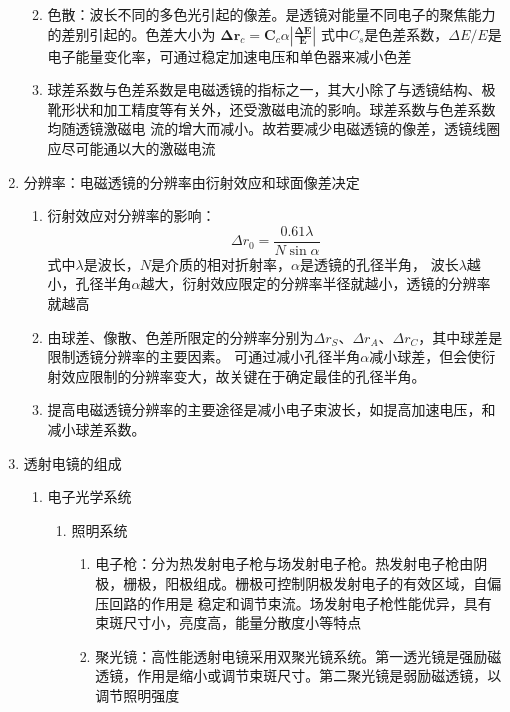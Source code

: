 \documentclass[12pt,a4paper]{article}
\begin{document}
\begin{enumerate}
\begin{enumerate}
\begin{enumerate}
            \end{enumerate}
            \item 色散：波长不同的多色光引起的像差。是透镜对能量不同电子的聚焦能力的差别引起的。色差大小为
            $\boldsymbol{\Delta} \boldsymbol{r}_{c}=\boldsymbol{C}_{c} \alpha\left|\frac{\boldsymbol{\Delta} \boldsymbol{E}}{\boldsymbol{E}}\right|$
            式中$C_{s}$是色差系数，$\Delta E / E$是电子能量变化率，可通过稳定加速电压和单色器来减小色差
            \item 球差系数与色差系数是电磁透镜的指标之一，其大小除了与透镜结构、极靴形状和加工精度等有关外，还受激磁电流的影响。球差系数与色差系数均随透镜激磁电
            流的增大而减小。故若要减少电磁透镜的像差，透镜线圈应尽可能通以大的激磁电流
        \end{enumerate}
        \item 分辨率：电磁透镜的分辨率由衍射效应和球面像差决定
        \begin{enumerate}
            \item 衍射效应对分辨率的影响：$$\Delta r_{0}=\frac{0.61 \lambda}{N \sin \alpha}$$
            式中$\lambda$是波长，$N$是介质的相对折射率，$\alpha$是透镜的孔径半角，
            波长$\lambda$越小，孔径半角$\alpha$越大，衍射效应限定的分辨率半径就越小，透镜的分辨率就越高
            \item 由球差、像散、色差所限定的分辨率分别为$\Delta r_{S}$、$\Delta r_{A}$、$\Delta r_{C}$，其中球差是限制透镜分辨率的主要因素。
            可通过减小孔径半角$\alpha$减小球差，但会使衍射效应限制的分辨率变大，故关键在于确定最佳的孔径半角。
            \item 提高电磁透镜分辨率的主要途径是减小电子束波长，如提高加速电压，和减小球差系数。
        \end{enumerate}
        \item 透射电镜的组成
        \begin{enumerate}
            \item 电子光学系统
            \begin{enumerate}
                \item 照明系统
                \begin{enumerate}
                    \item 电子枪：分为热发射电子枪与场发射电子枪。热发射电子枪由阴极，栅极，阳极组成。栅极可控制阴极发射电子的有效区域，自偏压回路的作用是
                    稳定和调节束流。场发射电子枪性能优异，具有束斑尺寸小，亮度高，能量分散度小等特点
                    \item 聚光镜：高性能透射电镜采用双聚光镜系统。第一透光镜是强励磁透镜，作用是缩小或调节束斑尺寸。第二聚光镜是弱励磁透镜，以调节照明强度

\end{enumerate}
\end{enumerate}
\end{enumerate}
\end{enumerate}
\end{document}
